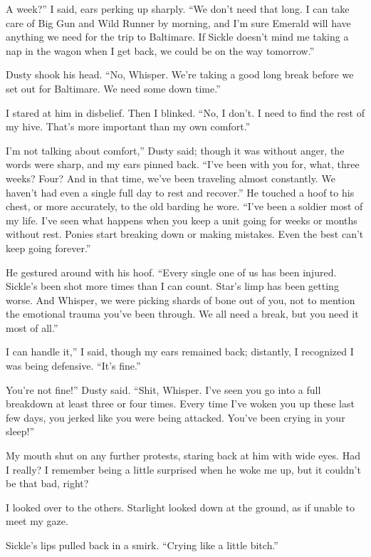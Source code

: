 \leavevmode{}A week?” I said, ears perking up sharply. “We don’t need that long. I can take care of Big Gun and Wild Runner by morning, and I’m sure Emerald will have anything we need for the trip to Baltimare. If Sickle doesn’t mind me taking a nap in the wagon when I get back, we could be on the way tomorrow.”

Dusty shook his head. “No, Whisper. We’re taking a good long break before we set out for Baltimare. We need some down time.”

I stared at him in disbelief. Then I blinked. “No, I don’t. I need to find the rest of my hive. That’s more important than my own comfort.”

\leavevmode{}I’m not talking about comfort,” Dusty said; though it was without anger, the words were sharp, and my ears pinned back. “I’ve been with you for, what, three weeks? Four? And in that time, we’ve been traveling almost constantly. We haven’t had even a single full day to rest and recover.” He touched a hoof to his chest, or more accurately, to the old barding he wore. “I’ve been a soldier most of my life. I’ve seen what happens when you keep a unit going for weeks or months without rest. Ponies start breaking down or making mistakes. Even the best can’t keep going forever.”

He gestured around with his hoof. “Every single one of us has been injured. Sickle’s been shot more times than I can count. Star’s limp has been getting worse. And Whisper, we were picking shards of bone out of you, not to mention the emotional trauma you’ve been through. We all need a break, but you need it most of all.”

\leavevmode{}I can handle it,” I said, though my ears remained back; distantly, I recognized I was being defensive. “It’s fine.”

\leavevmode{}You’re not fine!” Dusty said. “Shit, Whisper. I’ve seen you go into a full breakdown at least three or four times. Every time I’ve woken you up these last few days, you jerked like you were being attacked. You’ve been crying in your sleep!”

My mouth shut on any further protests, staring back at him with wide eyes. Had I really? I remember being a little surprised when he woke me up, but it couldn’t be that bad, right?

I looked over to the others. Starlight looked down at the ground, as if unable to meet my gaze.

Sickle’s lips pulled back in a smirk. “Crying like a little bitch.”

